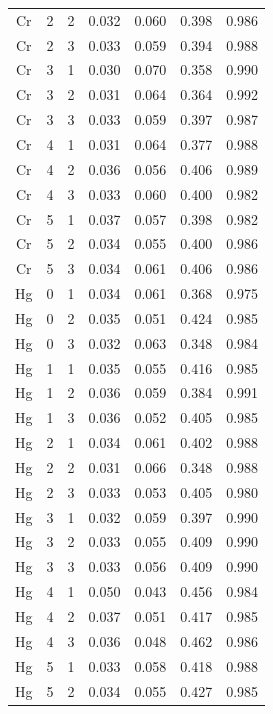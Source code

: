 \documentclass[ms, hidelinks]{uncgdissertationexp}
\theoremstyle{plain}
\theoremstyle{definition}
\theoremstyle{remark}
\begin{document}
\begin{longtable}{ccccccc}
Cr & 2 & 2 & 0.032 & 0.060 & 0.398 & 0.986\\
\rowcolor{gray!6}  Cr & 2 & 3 & 0.033 & 0.059 & 0.394 & 0.988\\
Cr & 3 & 1 & 0.030 & 0.070 & 0.358 & 0.990\\
\rowcolor{gray!6}  Cr & 3 & 2 & 0.031 & 0.064 & 0.364 & 0.992\\
Cr & 3 & 3 & 0.033 & 0.059 & 0.397 & 0.987\\
\rowcolor{gray!6}  Cr & 4 & 1 & 0.031 & 0.064 & 0.377 & 0.988\\
Cr & 4 & 2 & 0.036 & 0.056 & 0.406 & 0.989\\
\rowcolor{gray!6}  Cr & 4 & 3 & 0.033 & 0.060 & 0.400 & 0.982\\
Cr & 5 & 1 & 0.037 & 0.057 & 0.398 & 0.982\\
\rowcolor{gray!6}  Cr & 5 & 2 & 0.034 & 0.055 & 0.400 & 0.986\\
Cr & 5 & 3 & 0.034 & 0.061 & 0.406 & 0.986\\
\rowcolor{gray!6}  Hg & 0 & 1 & 0.034 & 0.061 & 0.368 & 0.975\\
Hg & 0 & 2 & 0.035 & 0.051 & 0.424 & 0.985\\
\rowcolor{gray!6}  Hg & 0 & 3 & 0.032 & 0.063 & 0.348 & 0.984\\
Hg & 1 & 1 & 0.035 & 0.055 & 0.416 & 0.985\\
\rowcolor{gray!6}  Hg & 1 & 2 & 0.036 & 0.059 & 0.384 & 0.991\\
Hg & 1 & 3 & 0.036 & 0.052 & 0.405 & 0.985\\
\rowcolor{gray!6}  Hg & 2 & 1 & 0.034 & 0.061 & 0.402 & 0.988\\
Hg & 2 & 2 & 0.031 & 0.066 & 0.348 & 0.988\\
\rowcolor{gray!6}  Hg & 2 & 3 & 0.033 & 0.053 & 0.405 & 0.980\\
Hg & 3 & 1 & 0.032 & 0.059 & 0.397 & 0.990\\
\rowcolor{gray!6}  Hg & 3 & 2 & 0.033 & 0.055 & 0.409 & 0.990\\
Hg & 3 & 3 & 0.033 & 0.056 & 0.409 & 0.990\\
\rowcolor{gray!6}  Hg & 4 & 1 & 0.050 & 0.043 & 0.456 & 0.984\\
Hg & 4 & 2 & 0.037 & 0.051 & 0.417 & 0.985\\
\rowcolor{gray!6}  Hg & 4 & 3 & 0.036 & 0.048 & 0.462 & 0.986\\
Hg & 5 & 1 & 0.033 & 0.058 & 0.418 & 0.988\\
\rowcolor{gray!6}  Hg & 5 & 2 & 0.034 & 0.055 & 0.427 & 0.985\\

\end{longtable}
\end{document}
